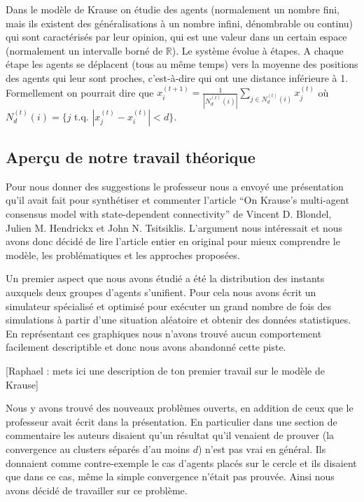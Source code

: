\documentclass[a4paper,10pt]{article}
\begin{document}
Dans le modèle de Krause on étudie des agents (normalement un nombre fini, mais ils existent des généralisations à un nombre infini, dénombrable ou continu) qui sont caractérisés par leur opinion, qui est une valeur dans un certain espace (normalement un intervalle borné de $\mathbb{R}$). Le système évolue à étapes. A chaque étape les agents se déplacent (tous au même temps) vers la moyenne des positions des agents qui leur sont proches, c'est-à-dire qui ont une distance inférieure à 1. Formellement on pourrait dire que $x_i^{(t+1)} = \frac{1}{|N_d^{(t)}(i)|} \sum_{j \in N_d^{(t)}(i)} x_j^{(t)}$ où $N_d^{(t)}(i) = \{j \text{ t.q. } |x_j^{(t)} - x_i^{(t)}| < d\}$.

\subsection{Aperçu de notre travail théorique}

Pour nous donner des suggestions le professeur nous a envoyé une présenta\-tion qu'il avait fait pour synthétiser et commenter l'article ``On Krause’s multi-agent consensus model with state-dependent connectivity'' de Vincent D. Blondel, Julien M. Hendrickx et John N. Tsitsiklis. L'argument nous intéressait et nous avons donc décidé de lire l'article entier en original pour mieux comprendre le modèle, les problématiques et les approches proposées.

Un premier aspect que nous avons étudié a été la distribution des instants auxquels deux groupes d'agents s'unifient. Pour cela nous avons écrit un simulateur spécialisé et optimisé pour exécuter un grand nombre de fois des  simulations à partir d'une situation aléatoire et obtenir des données statistiques. En représentant ces graphiques nous n'avons trouvé aucun comportement facilement descriptible et donc nous avons abandonné cette piste.

[Raphael : mets ici une description de ton premier travail sur le modèle de Krause]

Nous y avons trouvé des nouveaux problèmes ouverts, en addition de ceux que le professeur avait écrit dans la présentation. En particulier dans une section de commentaire les auteurs disaient qu'un résultat qu'il venaient de prouver (la convergence au clusters séparés d'au moins $d$) n'est pas vrai en général. Ils donnaient comme contre-exemple le cas d'agents placés sur le cercle et ils disaient que dans ce cas, même la simple convergence n’était pas prouvée. Ainsi nous avons décidé de travailler sur ce problème.
\end{document}
